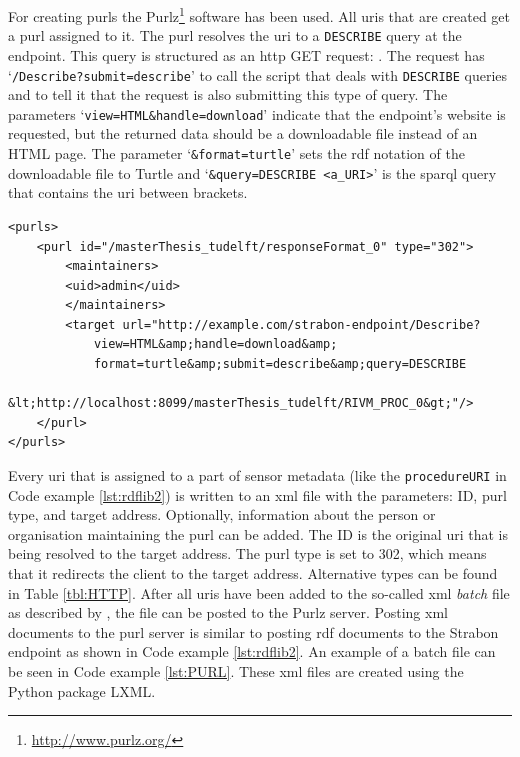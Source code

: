 For creating \aclp{purl} the Purlz\footnote{\url{http://www.purlz.org/}} software has been used. All \acp{uri} that are created get a \ac{purl} assigned to it. The \ac{purl} resolves the \ac{uri} to a \texttt{DESCRIBE} query at the endpoint. This query is structured as an \ac{http} GET request: \texttt{}. The request has `\texttt{/Describe?submit=describe}' to call the script that deals with \texttt{DESCRIBE} queries and to tell it that the request is also submitting this type of query. The parameters `\texttt{view=HTML\&handle=download}' indicate that the endpoint's website is requested, but the returned data should be a downloadable file instead of an HTML page. The parameter `\texttt{\&format=turtle}' sets the \ac{rdf} notation of the downloadable file to Turtle and `\texttt{\&query=DESCRIBE <a\_URI>}' is the \ac{sparql} query that contains the \ac{uri} between brackets. 

\begin{lstlisting}[float,caption={Example of a PURL batch file (containing one PURL)}, label={lst:PURL}]
<purls>
	<purl id="/masterThesis_tudelft/responseFormat_0" type="302">
		<maintainers>
		<uid>admin</uid>
		</maintainers>
		<target url="http://example.com/strabon-endpoint/Describe?
			view=HTML&amp;handle=download&amp;
			format=turtle&amp;submit=describe&amp;query=DESCRIBE 
			&lt;http://localhost:8099/masterThesis_tudelft/RIVM_PROC_0&gt;"/>
	</purl>
</purls>
\end{lstlisting}

Every \ac{uri} that is assigned to a part of sensor metadata (like the \texttt{procedureURI} in Code example \ref{lst:rdflib2}) is written to an \ac{xml} file with the parameters: ID, \ac{purl} type, and target address. Optionally, information about the person or organisation maintaining the \ac{purl} can be added. The ID is the original \ac{uri} that is being resolved to the target address. The \ac{purl} type is set to 302, which means that it redirects the client to the target address. Alternative types can be found in Table \ref{tbl:HTTP}. After all \acp{uri} have been added to the so-called \ac{xml} \textit{batch} file as described by \cite{LD:PURL2}, the file can be posted to the Purlz server. Posting \ac{xml} documents to the \ac{purl} server is similar to posting \ac{rdf} documents to the Strabon endpoint as shown in Code example \ref{lst:rdflib2}. An example of a batch file can be seen in Code example \ref{lst:PURL}. These \ac{xml} files are created using the Python package LXML. 

